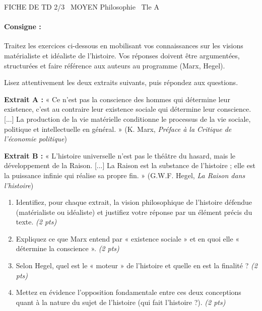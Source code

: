 \documentclass[11pt]{article}
\begin{document}
\begin{tcolorbox}[enhanced,colback=popink,colframe=popink,arc=10pt,boxrule=0pt,left=12pt,right=12pt,top=9pt,bottom=9pt]
{\color{white}\popxbold\small FICHE DE TD 2/3 \textbullet\ MOYEN \hfill Philosophie \textbullet\ Tle A\par}
\end{tcolorbox}
\vspace{4pt}
\paragraph{Consigne :} Traitez les exercices ci-dessous en mobilisant vos connaissances sur les visions matérialiste et idéaliste de l'histoire. Vos réponses doivent être argumentées, structurées et faire référence aux auteurs au programme (Marx, Hegel).

\begin{exercice}
Lisez attentivement les deux extraits suivants, puis répondez aux questions.

\textbf{Extrait A :} « Ce n'est pas la conscience des hommes qui détermine leur existence, c'est au contraire leur existence sociale qui détermine leur conscience. [...] La production de la vie matérielle conditionne le processus de la vie sociale, politique et intellectuelle en général. » (K. Marx, \textit{Préface à la Critique de l'économie politique})

\textbf{Extrait B :} « L'histoire universelle n'est pas le théâtre du hasard, mais le développement de la Raison. [...] La Raison est la substance de l'histoire ; elle est la puissance infinie qui réalise sa propre fin. » (G.W.F. Hegel, \textit{La Raison dans l'histoire})

\begin{enumerate}
    \item Identifiez, pour chaque extrait, la vision philosophique de l'histoire défendue (matérialiste ou idéaliste) et justifiez votre réponse par un élément précis du texte. \textit{(2 pts)}
    \item Expliquez ce que Marx entend par « existence sociale » et en quoi elle « détermine la conscience ». \textit{(2 pts)}
    \item Selon Hegel, quel est le « moteur » de l'histoire et quelle en est la finalité ? \textit{(2 pts)}
    \item Mettez en évidence l'opposition fondamentale entre ces deux conceptions quant à la nature du sujet de l'histoire (qui fait l'histoire ?). \textit{(2 pts)}
\end{enumerate}
\end{exercice}
\end{document}
